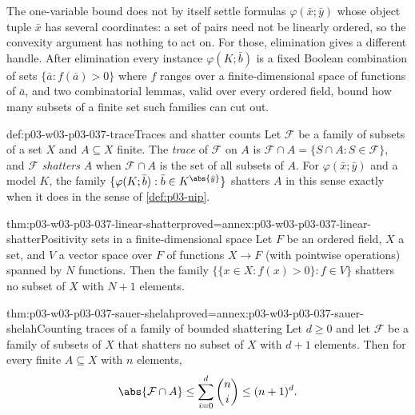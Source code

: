 The one-variable bound does not by itself settle formulas \(\varphi(\bar x;\bar y)\)
whose object tuple \(\bar x\) has several coordinates: a set of pairs need not
be linearly ordered, so the convexity argument has nothing to act on.  For
those, elimination gives a different handle.  After elimination every
instance \(\varphi(K;\bar b)\) is a fixed Boolean combination of sets
\(\{\bar a:f(\bar a)>0\}\) where \(f\) ranges over a finite-dimensional space
of functions of \(\bar a\), and two combinatorial lemmas, valid over every
ordered field, bound how many subsets of a finite set such families can cut
out.

\begin{hbdefinition}{def:p03-w03-p03-037-trace}{Traces and shatter counts}
Let \(\mathcal F\) be a family of subsets of a set \(X\) and \(A\subseteq X\)
finite.  The \emph{trace} of \(\mathcal F\) on \(A\) is
\(\mathcal F\cap A=\{S\cap A:S\in\mathcal F\}\), and \(\mathcal F\)
\emph{shatters} \(A\) when \(\mathcal F\cap A\) is the set of all subsets of
\(A\).  For \(\varphi(\bar x;\bar y)\) and a model \(K\), the family
\(\{\varphi(K;\bar b):\bar b\in K^{\abs{\bar y}}\}\) shatters \(A\) in this
sense exactly when it does in the sense of \cref{def:p03-nip}.
\end{hbdefinition}

\begin{hblemma}{thm:p03-w03-p03-037-linear-shatter}{proved=annex:p03-w03-p03-037-linear-shatter}{Positivity sets in a finite-dimensional space}
Let \(F\) be an ordered field, \(X\) a set, and \(V\) a vector space over
\(F\) of functions \(X\to F\) (with pointwise operations) spanned by \(N\)
functions.  Then the family \(\{\{x\in X:f(x)>0\}:f\in V\}\) shatters no
subset of \(X\) with \(N+1\) elements.
\end{hblemma}

\begin{hblemma}{thm:p03-w03-p03-037-sauer-shelah}{proved=annex:p03-w03-p03-037-sauer-shelah}{Counting traces of a family of bounded shattering}
Let \(d\geq0\) and let \(\mathcal F\) be a family of subsets of \(X\) that
shatters no subset of \(X\) with \(d+1\) elements.  Then for every finite
\(A\subseteq X\) with \(n\) elements,
\[
\abs{\mathcal F\cap A}\leq\sum_{i=0}^{d}\binom ni\leq(n+1)^d .
\]
\end{hblemma}

